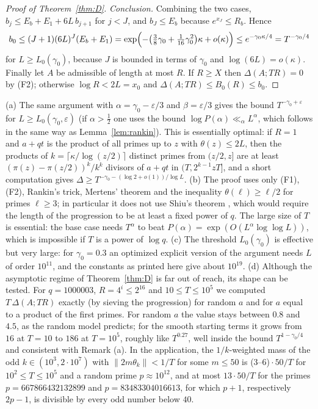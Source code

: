 \begin{proof}[Proof of Theorem~\ref{thm:D}]
\emph{Conclusion.} Combining the two cases, $b_j\le E_b+E_1+6L\,b_{j+1}$ for $j<J$, and $b_J\le E_b$ because
$e^{x_J}\le R_b$. Hence
\[
b_0\le(J+1)(6L)^J(E_b+E_1)=\exp\Bigl(-\bigl(\tfrac38\gamma_0+\tfrac1{16}\gamma_0^2\bigr)\kappa+o(\kappa)\Bigr)\le
e^{-\gamma_0\kappa/4}=T^{-\gamma_0/4}
\]
for $L\ge L_0(\gamma_0)$, because $J$ is bounded in terms of $\gamma_0$ and $\log(6L)=o(\kappa)$. Finally let $A$ be
admissible of length at most $R$. If $R\ge X$ then $\Delta(A;TR)=0$ by (F2); otherwise $\log R<2L=x_0$ and
$\Delta(A;TR)\le B_0(R)\le b_0$.
\end{proof}

\begin{remark}\label{rem:exponent-optimality}
(a) The same argument with $\alpha=\gamma_0-\varepsilon/3$ and $\beta=\varepsilon/3$ gives the bound
$T^{-\gamma_0+\varepsilon}$ for $L\ge L_0(\gamma_0,\varepsilon)$ (if $\alpha>\frac12$ one uses the bound
$\log P(\alpha)\ll_\alpha L^\alpha$, which follows in the same way as Lemma~\ref{lem:rankin}). This is essentially
optimal: if $R=1$ and $a+qt$ is the product of all primes up to $z$ with $\theta(z)\le2L$, then the products of
$k=\lceil\kappa/\log(z/2)\rceil$ distinct primes from $(z/2,z]$ are at least $(\pi(z)-\pi(z/2))^k/k^k$ divisors of
$a+qt$ in $(T,2^{k-1}zT]$, and a short computation gives $\Delta\ge T^{-\gamma_0-(\log2+o(1))/\log L}$. (b) The proof
uses only (F1), (F2), Rankin's trick, Mertens' theorem and the inequality $\theta(\ell)\ge\ell/2$ for primes
$\ell\ge3$; in particular it does not use Shiu's theorem \cite{b24}, which would require the length of the progression
to be at least a fixed power of $q$. The large size of $T$ is essential: the base case needs $T^\alpha$ to beat
$P(\alpha)=\exp(O(L^\alpha\log\log L))$, which is impossible if $T$ is a power of $\log q$. (c) The threshold
$L_0(\gamma_0)$ is effective but very large: for $\gamma_0=0.3$ an optimized explicit version of the argument needs
$L$ of order $10^{11}$, and the constants as printed here give about $10^{19}$. (d) Although the asymptotic regime of
Theorem~\ref{thm:D} is far out of reach, its shape can be tested. For $q=1000003$, $R=4^i\le2^{16}$ and $10\le T\le10^5$ we
computed $T\,\Delta(A;TR)$ exactly (by sieving the progression) for random $a$ and for $a$ equal to a product of the
first primes. For random $a$ the value stays between $0.8$ and $4.5$, as the random model predicts; for the smooth
starting terms it grows from $16$ at $T=10$ to $186$ at $T=10^5$, roughly like $T^{0.27}$, well inside the bound
$T^{1-\gamma_0/4}$ and consistent with Remark (a). In the application, the $1/k$-weighted mass of the odd
$k\in(10^3,2\cdot10^7)$ with $\|2m\theta_k\|<1/T$ for some $m\le50$ is (3--6)${}\cdot50/T$ for $10^2\le T\le10^5$ and
a random prime $p\approx10^{12}$, and at most $13\cdot50/T$ for the primes $p=667866432132899$ and
$p=83483304016613$, for which $p+1$, respectively $2p-1$, is divisible by every odd number below $40$.
\end{remark}

